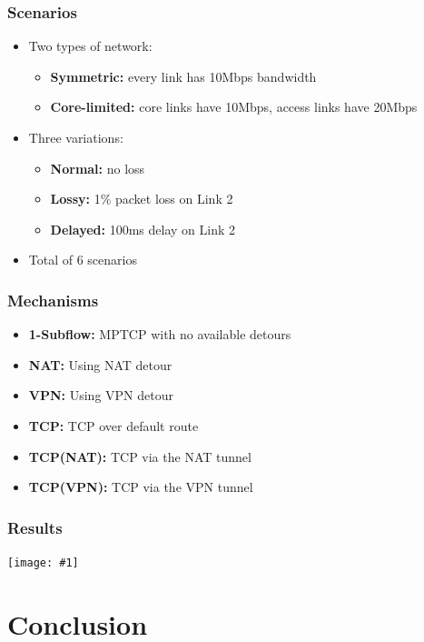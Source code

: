 \documentclass{beamer}
\newcommand{\FigureSlide}[2]{
  \begin{frame}[plain]
    \begin{centering}
      \vfill
      \texttt{[image: \#1]}
      \vfill
      \end{centering}
    \note{#2}
  \end{frame}
}
\begin{document}
\begin{frame}
  \frametitle{Scenarios}

  \begin{itemize}
  \item Two types of network:
    \begin{itemize}
    \item \textbf{Symmetric:} every link has 10Mbps bandwidth
    \item \textbf{Core-limited:} core links have 10Mbps, access links have 20Mbps
    \end{itemize}
  \item Three variations:
    \begin{itemize}
    \item \textbf{Normal:} no loss
    \item \textbf{Lossy:} 1\% packet loss on Link 2
    \item \textbf{Delayed:} 100ms delay on Link 2
    \end{itemize}
  \item Total of 6 scenarios
  \end{itemize}
\end{frame}

\begin{frame}
  \frametitle{Mechanisms}

  \begin{itemize}
  \item \textbf{1-Subflow:} MPTCP with no available detours
  \item \textbf{NAT:} Using NAT detour
  \item \textbf{VPN:} Using VPN detour
  \item \textbf{TCP:} TCP over default route
  \item \textbf{TCP(NAT):} TCP via the NAT tunnel
  \item \textbf{TCP(VPN):} TCP via the VPN tunnel
  \end{itemize}
\end{frame}

\begin{frame}
  \frametitle{Results}
\end{frame}

\FigureSlide{figures/sym.pdf}{
  \begin{itemize}
  \item This is
  \end{itemize}
}

\section{Conclusion}
\end{document}
